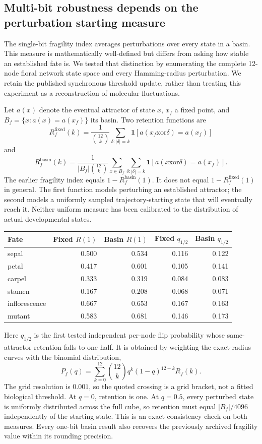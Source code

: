 \subsection{Multi-bit robustness depends on the perturbation starting measure}
The single-bit fragility index averages perturbations over every state in a basin. This measure is mathematically well-defined but differs from asking how stable an established fate is. We tested that distinction by enumerating the complete 12-node floral network state space and every Hamming-radius perturbation. We retain the published synchronous threshold update, rather than treating this experiment as a reconstruction of molecular fluctuations.

Let $a(x)$ denote the eventual attractor of state $x$, $x_f$ a fixed point, and $B_f=\{x:a(x)=a(x_f)\}$ its basin. Two retention functions are
\[
R_f^{\mathrm{fixed}}(k)=\frac{1}{\binom{12}{k}}\sum_{\delta:|\delta|=k}\mathbf{1}[a(x_f\mathbin{\mathrm{xor}}\delta)=a(x_f)]
\]
and
\[
R_f^{\mathrm{basin}}(k)=\frac{1}{|B_f|\binom{12}{k}}\sum_{x\in B_f}\sum_{\delta:|\delta|=k}\mathbf{1}[a(x\mathbin{\mathrm{xor}}\delta)=a(x_f)].
\]
The earlier fragility index equals $1-R_f^{\mathrm{basin}}(1)$. It does not equal $1-R_f^{\mathrm{fixed}}(1)$ in general. The first function models perturbing an established attractor; the second models a uniformly sampled trajectory-starting state that will eventually reach it. Neither uniform measure has been calibrated to the distribution of actual developmental states.

\begin{center}\begin{tabular}{lrrrr}\hline
Fate & Fixed $R(1)$ & Basin $R(1)$ & Fixed $q_{1/2}$ & Basin $q_{1/2}$\\\hline
sepal & 0.500 & 0.534 & 0.116 & 0.122 \\
petal & 0.417 & 0.601 & 0.105 & 0.141 \\
carpel & 0.333 & 0.319 & 0.084 & 0.083 \\
stamen & 0.167 & 0.208 & 0.068 & 0.071 \\
inflorescence & 0.667 & 0.653 & 0.167 & 0.163 \\
mutant & 0.583 & 0.681 & 0.146 & 0.173 \\
\hline\end{tabular}\end{center}
Here $q_{1/2}$ is the first tested independent per-node flip probability whose same-attractor retention falls to one half. It is obtained by weighting the exact-radius curves with the binomial distribution,
\[
P_f(q)=\sum_{k=0}^{12}\binom{12}{k}q^k(1-q)^{12-k}R_f(k).
\]
The grid resolution is $0.001$, so the quoted crossing is a grid bracket, not a fitted biological threshold. At $q=0$, retention is one. At $q=0.5$, every perturbed state is uniformly distributed across the full cube, so retention must equal $|B_f|/4096$ independently of the starting state. This is an exact consistency check on both measures. Every one-bit basin result also recovers the previously archived fragility value within its rounding precision.

